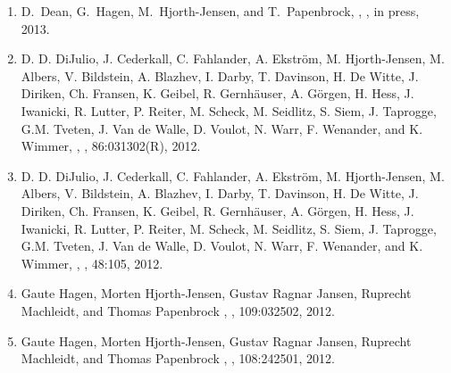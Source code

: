 \documentclass[prc,amsart,english,twocolumn,superscriptaddress,showpacs,floatfix]{revtex4}
\begin{document}
\begin{enumerate}
 \item D.~Dean, G.~Hagen, M.~Hjorth-Jensen, and T.~Papenbrock,
 , 
 ,  in press, 2013.


 \item D. D. DiJulio, J. Cederkall, C. Fahlander, A. Ekstr\"om, M. Hjorth-Jensen, M. Albers, V. Bildstein,
 A. Blazhev, I. Darby, T. Davinson, H. De Witte, J. Diriken, Ch. Fransen, K. Geibel, R. Gernh\"auser,
 A. G\"orgen, H. Hess, J. Iwanicki, R. Lutter, P. Reiter, M. Scheck, M. Seidlitz, S. Siem, J. Taprogge,
 G.M. Tveten, J. Van de Walle, D. Voulot, N. Warr, F. Wenander, and K. Wimmer,
 , 
 ,  86:031302(R), 2012.

 \item D. D. DiJulio, J. Cederkall, C. Fahlander, A. Ekstr\"om, M. Hjorth-Jensen, M. Albers, V. Bildstein,
 A. Blazhev, I. Darby, T. Davinson, H. De Witte, J. Diriken, Ch. Fransen, K. Geibel, R. Gernh\"auser,
 A. G\"orgen, H. Hess, J. Iwanicki, R. Lutter, P. Reiter, M. Scheck, M. Seidlitz, S. Siem, J. Taprogge,
 G.M. Tveten, J. Van de Walle, D. Voulot, N. Warr, F. Wenander, and K. Wimmer,
 , 
 , 48:105,  2012.


 \item
 Gaute Hagen, Morten Hjorth-Jensen, Gustav Ragnar Jansen, Ruprecht Machleidt, and Thomas Papenbrock
 , 
 , 109:032502, 2012.

 \item
 Gaute Hagen, Morten Hjorth-Jensen, Gustav Ragnar Jansen, Ruprecht Machleidt, and Thomas Papenbrock
 , 
 , 108:242501, 2012.

 \end{enumerate}
\end{document}
